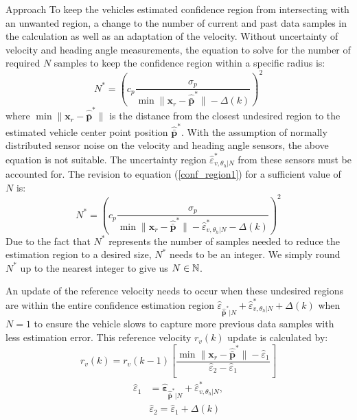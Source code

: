 \begin{section}{Approach}
To keep the vehicles estimated confidence region from intersecting with an unwanted region, a change to the number of current and past data samples in the calculation as well as an adaptation of the velocity. Without uncertainty of velocity and heading angle measurements, the equation to solve for the number of required $N$ samples to keep the confidence region within a specific radius is:
    \begin{equation}
    \label{conf_region1}
	    N^* = \left(c_p \frac{ \sigma_p }{ {\min \lVert \bm{x}_r - \hat{\bar{\bm{p}}}^* \rVert} -\Delta(k) } \right)^2
	\end{equation}
where $ \min \lVert {\bm{x}_r-\hat{\bar{\bm{p}}}^*} \rVert$ is the distance from the closest undesired region to the estimated vehicle center point position $\hat{\bar{\bm{p}}}^*$.
With the assumption of normally distributed sensor noise on the velocity and heading angle sensors, the above equation is not suitable. The uncertainty region $\hat{\varepsilon}_{v,\theta_h|N}^{*}$ from these sensors must be accounted for. The revision to equation (\ref{conf_region1}) for a sufficient value of $N$ is:
    \begin{equation}
	    N^* = \left(c_p \frac{ \sigma_p }{ {\min \lVert \bm{x}_r - \hat{\bar{\bm{p}}}^* \rVert} -\hat{\varepsilon}_{v,\theta_h|N}^{*}-\Delta(k) } \right)^2
	\end{equation}
Due to the fact that $N^*$ represents the number of samples needed to reduce the estimation region to a desired size, $N^*$ needs to be an integer. We simply round $N^*$ up to the nearest integer to give us $N \in \mathbb{N}$.

An update of the reference velocity needs to occur when these undesired regions are within the entire confidence estimation region $ \hat{\varepsilon}_{\hat{\bar{\bm{p}}}^*|N} +\hat{\varepsilon}_{v,\theta_h|N}^{*}+\Delta(k)$ when $N=1$ to ensure the vehicle slows to capture more previous data samples with less estimation error. This reference velocity $r_v(k)$ update is calculated by:
    \begin{equation}
	    r_v(k)=r_v(k-1) \left[ \frac{ \min \lVert \bm{x}_r - \hat{\bar{\bm{p}}}^* \rVert - \hat{\varepsilon}_1}{\hat{\varepsilon}_2 - \hat{\varepsilon}_1} \right]
	\end{equation}
	\begin{equation}
	\begin{split}
	    \hat{\varepsilon}_1&=\hat{\bm{\varepsilon}}_{\hat{\bar{\bm{p}}}^*|N} +\hat{\varepsilon}_{v,\theta_h|N}^{*},\\ &\hat{\varepsilon}_2=\hat{\varepsilon}_1+\Delta(k) \nonumber	    
	\end{split}
	\end{equation}
	

\end{section}
